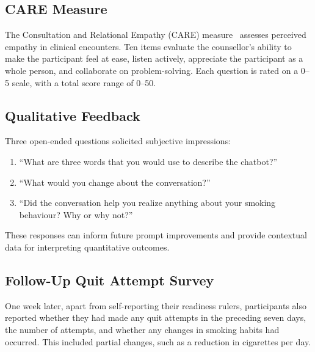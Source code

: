 \subsection{CARE Measure}
\label{subsec:care}
The Consultation and Relational Empathy (CARE) measure~\citep{10.1093/fampra/cmh621,Bikker2015} assesses perceived empathy in clinical encounters. Ten items evaluate the counsellor's ability to make the participant feel at ease, listen actively, appreciate the participant as a whole person, and collaborate on problem-solving. Each question is rated on a 0--5 scale, with a total score range of 0--50.

\subsection{Qualitative Feedback}
Three open-ended questions solicited subjective impressions:
\begin{enumerate}
	\item ``What are three words that you would use to describe the chatbot?''
	\item ``What would you change about the conversation?''
	\item ``Did the conversation help you realize anything about your smoking behaviour? Why or why not?''
\end{enumerate}
These responses can inform future prompt improvements and provide contextual data for interpreting quantitative outcomes.

\subsection{Follow-Up Quit Attempt Survey}
One week later, apart from self-reporting their readiness rulers, participants also reported whether they had made any quit attempts in the preceding seven days, the number of attempts, and whether any changes in smoking habits had occurred. This included partial changes, such as a reduction in cigarettes per day.

